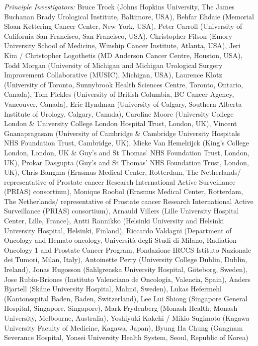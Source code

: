 \textit{Principle Investigators:} Bruce Trock (Johns Hopkins University, The James Buchanan Brady Urological Institute, Baltimore, USA), Behfar Ehdaie (Memorial Sloan Kettering Cancer Center, New York, USA), Peter Carroll (University of California San Francisco, San Francisco, USA), Christopher Filson (Emory University School of Medicine, Winship Cancer Institute,  Atlanta, USA), Jeri Kim / Christopher Logothetis (MD Anderson Cancer Centre, Houston, USA), Todd Morgan (University of Michigan and Michigan Urological Surgery Improvement Collaborative (MUSIC), Michigan, USA), Laurence Klotz (University of Toronto, Sunnybrook Health Sciences Centre, Toronto, Ontario, Canada),  Tom Pickles (University of British Columbia, BC Cancer Agency, Vancouver, Canada), Eric Hyndman (University of Calgary, Southern Alberta Institute of Urology, Calgary, Canada), Caroline Moore (University College London \& University College London Hospital Trust, London, UK), Vincent Gnanapragasam (University of Cambridge \& Cambridge University Hospitals NHS Foundation Trust, Cambridge, UK), Mieke Van Hemelrijck (King's College London, London, UK \& Guy’s and St Thomas’ NHS Foundation Trust, London, UK), Prokar Dasgupta (Guy’s and St Thomas’ NHS Foundation Trust, London, UK), Chris Bangma (Erasmus Medical Center, Rotterdam, The Netherlands/ representative of Prostate cancer Research International Active Surveillance (PRIAS) consortium), Monique Roobol (Erasmus Medical Center, Rotterdam, The Netherlands/ representative of Prostate cancer Research International Active Surveillance (PRIAS) consortium), Arnauld Villers (Lille University Hospital Center, Lille, France), Antti Rannikko (Helsinki University and Helsinki University Hospital, Helsinki, Finland), Riccardo Valdagni (Department of Oncology and Hemato-oncology, Università degli Studi di Milano, Radiation Oncology 1 and Prostate Cancer Program, Fondazione IRCCS Istituto Nazionale dei Tumori, Milan, Italy), Antoinette Perry (University College Dublin, Dublin, Ireland), Jonas Hugosson (Sahlgrenska University Hospital, Göteborg, Sweden), Jose Rubio-Briones (Instituto Valenciano de Oncología, Valencia, Spain), Anders Bjartell (Skåne University Hospital, Malmö, Sweden), Lukas Hefermehl (Kantonsspital Baden, Baden, Switzerland), Lee Lui Shiong (Singapore General Hospital, Singapore, Singapore), Mark Frydenberg (Monash Health; Monash University,  Melbourne, Australia), Yoshiyuki Kakehi / Mikio Sugimoto (Kagawa University Faculty of Medicine, Kagawa, Japan), Byung Ha Chung (Gangnam Severance Hospital, Yonsei University Health System, Seoul, Republic of Korea)

